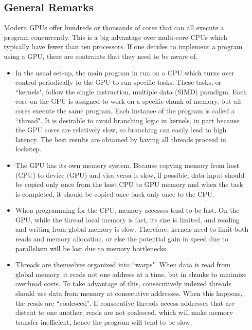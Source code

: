 \subsection{General Remarks}
Modern GPUs offer hundreds or thousands of cores that can all execute a program concurrently. This is a big advantage over multi-core CPUs which typically have fewer than ten processors. If one decides to implement a program using a GPU, there are contraints that they need to be aware of.
\begin{itemize}
\item
In the usual set-up, the main program in run on a CPU which turns over control periodically to the GPU to run specific tasks. These tasks, or ``kernels", follow the single instruction, multiple data (SIMD) paradigm. Each core on the GPU is assigned to work on a specific chunk of memory, but all cores execute the same program. Each instance of the program is called a ``thread". It is desirable to avoid branching logic in kernels, in part because the GPU cores are relatively slow, so branching can easily lead to high latency. The best results are obtained by having all threads proceed in lockstep.

\item
The GPU has its own memory system. Because copying memory from host (CPU) to device (GPU) and visa versa is slow, if possible, data input should be copied only once from the host CPU to GPU memory and when the task is completed, it should be copied once back only once to the CPU.

\item
When programming for the CPU, memory accesses tend to be fast. On the GPU, while the thread local memory is fast, its size is limited, and reading and writing from global memory is slow. Therefore, kernels need to limit both reads and memory allocation, or else the potential gain in speed due to parallelism will be lost due to memory bottlenecks.

\item
Threads are themselves organized into ``warps". When data is read from global memory, it reads not one address at a time, but in chunks to minimize overhead costs. To take advantage of this, consecutively indexed threads should use data from memory at consecutive addresses. When this happens, the reads are ``coalesced". If consecutive threads access addresses that are distant to one another, reads are not coalesced, which will make memory transfer inefficient, hence the program will tend to be slow.
\end{itemize}

